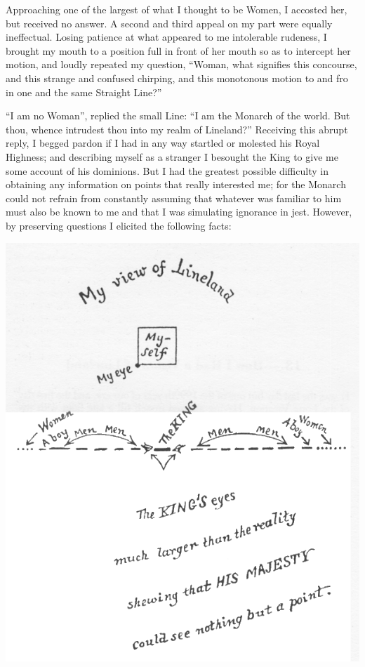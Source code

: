 \documentclass[12pt, a4paper, twoside]{memoir}
\begin{document}
Approaching one of the largest of what I thought to be Women, I accosted her,
but received no answer. A second and third appeal on my part were equally
ineffectual. Losing patience at what appeared to me intolerable rudeness, I
brought my mouth to a position full in front of her mouth so as to intercept
her motion, and loudly repeated my question, ``Woman, what signifies this
concourse, and this strange and confused chirping, and this monotonous motion
to and fro in one and the same Straight Line?''

``I am no Woman'', replied the small Line: ``I am the Monarch of the world. But
thou, whence intrudest thou into my realm of Lineland?'' Receiving this abrupt
reply, I begged pardon if I had in any way startled or molested his Royal
Highness; and describing myself as a stranger I besought the King to give me
some account of his dominions. But I had the greatest possible difficulty in
obtaining any information on points that really interested me; for the Monarch
could not refrain from constantly assuming that whatever was familiar to him
must also be known to me and that I was simulating ignorance in jest. However,
by preserving questions I elicited the following facts:

\includegraphics[trim=20mm 0mm 0mm 0mm,width=\linewidth]{fig6}
\end{document}
